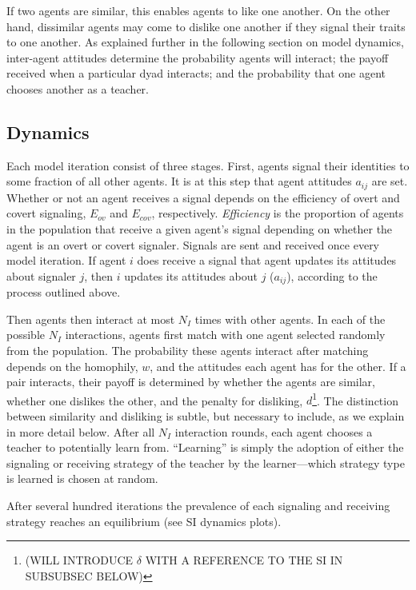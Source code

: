 \documentclass[11pt,letterpaper]{article}
\begin{document}
If two agents are similar, this enables agents to like one another. On the
other hand, dissimilar agents may come to dislike one another if they signal
their traits to one another. As explained further in the following section on
model dynamics, inter-agent attitudes determine the probability agents will
interact; the payoff received when a particular dyad interacts; and the
probability that one agent chooses another as a teacher.

\subsection{Dynamics}

Each model iteration consist of three stages. First, agents signal their identities
to some fraction of all other agents. It is at this step that agent attitudes
$a_{ij}$ are set. Whether or not an agent receives a signal depends on the
efficiency of overt and covert signaling, $E_{ov}$ and $E_{cov}$, respectively.
\emph{Efficiency} is the proportion of agents in the population that receive
a given agent's signal depending on whether the agent is an overt or covert
signaler.  Signals are sent and received once every model iteration. 
If agent $i$ does receive a signal that agent updates its attitudes about
signaler $j$, then $i$ updates its attitudes about $j$ ($a_{ij}$), according to
the process outlined above.

Then agents then
interact at most $N_I$ times with other agents. In each of the possible 
$N_I$ interactions, agents first match with one agent selected randomly from
the population. The probability these agents interact after matching depends
on the homophily, $w$, and the attitudes each agent has for the other. 
If a pair interacts, their payoff is determined by whether the agents are
similar, whether one dislikes the other, and the penalty for disliking,
$d$\footnote{(WILL INTRODUCE $\delta$ WITH A REFERENCE TO THE SI IN SUBSUBSEC
BELOW)}. The distinction between similarity and disliking is subtle, 
but necessary to include, as we explain in more detail below. After all
$N_I$ interaction rounds, each agent chooses a teacher to potentially learn
from. ``Learning'' is simply the adoption of either the signaling or
receiving strategy of the teacher by the learner---which strategy type is 
learned is chosen at random. 

After several hundred iterations the prevalence of each signaling and
receiving strategy reaches an equilibrium (see SI dynamics plots). 
\end{document}
